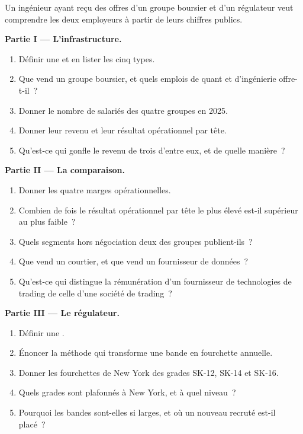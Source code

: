\begin{problem}\label{pb:in:exchanges-brokers-vendors-and-regulators-as-employers:1}
Un ingénieur ayant reçu des offres d'un groupe boursier et d'un régulateur veut comprendre les deux employeurs à partir de leurs
chiffres publics.

\medskip\noindent\textbf{Partie I --- L'infrastructure.}
\begin{enumerate}
\item Définir une  et en lister les cinq types.
\item Que vend un groupe boursier, et quels emplois de quant et d'ingénierie offre-t-il~?
\item Donner le nombre de salariés des quatre groupes en 2025.
\item Donner leur revenu et leur résultat opérationnel par tête.
\item Qu'est-ce qui gonfle le revenu de trois d'entre eux, et de quelle manière~?
\end{enumerate}

\medskip\noindent\textbf{Partie II --- La comparaison.}
\begin{enumerate}[resume]
\item Donner les quatre marges opérationnelles.
\item Combien de fois le résultat opérationnel par tête le plus élevé est-il supérieur au plus faible~?
\item Quels segments hors négociation deux des groupes publient-ils~?
\item Que vend un courtier, et que vend un fournisseur de données~?
\item Qu'est-ce qui distingue la rémunération d'un fournisseur de technologies de trading de celle d'une société de trading~?
\end{enumerate}

\medskip\noindent\textbf{Partie III --- Le régulateur.}
\begin{enumerate}[resume]
\item Définir une .
\item Énoncer la méthode qui transforme une bande en fourchette annuelle.
\item Donner les fourchettes de New York des grades SK-12, SK-14 et SK-16.
\item Quels grades sont plafonnés à New York, et à quel niveau~?
\item Pourquoi les bandes sont-elles si larges, et où un nouveau recruté est-il placé~?
\end{enumerate}


\end{problem}
